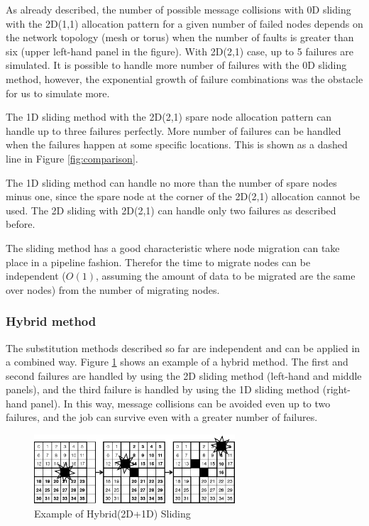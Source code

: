 \documentclass[Afour,times,sageh]{sagej}
\begin{document}
As already described, the number of
possible message collisions with 0D sliding with the 2D(1,1)
allocation pattern for a given number of failed nodes depends on the
network topology (mesh or torus) when the number of faults is greater
than six (upper left-hand panel in the figure). With 2D(2,1) case, up
to 5 failures are simulated. It is possible to handle more number of
failures with the 0D sliding method, however, the exponential growth
of failure combinations was the obstacle for us to simulate more.

The 1D sliding method with the 2D(2,1) spare node allocation pattern
can handle up to three failures perfectly. More number of failures can
be handled when the failures happen at some specific locations. This
is shown as a dashed line in Figure \ref{fig:comparison}.

The 1D sliding method can handle no more than the number of
spare nodes minus one, since the spare node at the corner of the
2D(2,1) allocation cannot be used. The 2D sliding with 2D(2,1) can
handle only two failures as described before.

The sliding method has a good characteristic where node migration can
take place in a pipeline fashion. Therefor the time to migrate nodes
can be independent ($O(1)$, assuming the amount of data to be migrated
are the same over nodes) from the number of migrating nodes.

\subsubsection*{Hybrid method}

The substitution methods described so far are independent and can be
applied in a combined way. Figure \ref{fig:hybrid-sliding} shows an
example of a hybrid method. The first and second failures are handled
by using the 2D sliding method (left-hand and middle panels), and the
third failure is handled by using the 1D sliding method (right-hand
panel). In this way, message collisions can be avoided even up to two
failures, and the job can survive even with a greater number of
failures.

\begin{figure}[ht]
\centering
\includegraphics[width=75mm]{Figs/Hybrid.eps}
  \caption{Example of Hybrid(2D+1D) Sliding}
  \label{fig:hybrid-sliding}
\end{figure}
\end{document}
